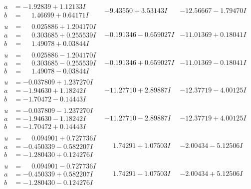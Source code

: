 \documentclass[1p]{elsarticle_modified}
\theoremstyle{definition}
\begin{document}
$$\begin{array}{c|c|c}
\begin{aligned}
a &= -1.92839 + 1.12133 I \\
b &= \phantom{-}1.46699 + 0.64171 I\end{aligned}
 & -9.43550 + 3.53143 I & -12.56667 - 1.79470 I \\ \hline\begin{aligned}
u &= \phantom{-}0.025886 + 1.204170 I \\
a &= \phantom{-}0.303685 + 0.255539 I \\
b &= \phantom{-}1.49078 + 0.03844 I\end{aligned}
 & -0.191346 - 0.659027 I & -11.01369 + 0.18041 I \\ \hline\begin{aligned}
u &= \phantom{-}0.025886 - 1.204170 I \\
a &= \phantom{-}0.303685 - 0.255539 I \\
b &= \phantom{-}1.49078 - 0.03844 I\end{aligned}
 & -0.191346 + 0.659027 I & -11.01369 - 0.18041 I \\ \hline\begin{aligned}
u &= -0.037809 + 1.237270 I \\
a &= -1.94630 + 1.18242 I \\
b &= -1.70472 - 0.14443 I\end{aligned}
 & -11.27710 + 2.89887 I & -12.37719 - 4.00125 I \\ \hline\begin{aligned}
u &= -0.037809 - 1.237270 I \\
a &= -1.94630 - 1.18242 I \\
b &= -1.70472 + 0.14443 I\end{aligned}
 & -11.27710 - 2.89887 I & -12.37719 + 4.00125 I \\ \hline\begin{aligned}
u &= \phantom{-}0.094901 + 0.727736 I \\
a &= -0.450339 - 0.582207 I \\
b &= -1.280430 + 0.124276 I\end{aligned}
 & \phantom{-}1.74291 + 1.07503 I & -2.00434 - 5.12506 I \\ \hline\begin{aligned}
u &= \phantom{-}0.094901 - 0.727736 I \\
a &= -0.450339 + 0.582207 I \\
b &= -1.280430 - 0.124276 I\end{aligned}
 & \phantom{-}1.74291 - 1.07503 I & -2.00434 + 5.12506 I \\ \hline\begin{aligned}

\end{aligned}
\end{array}$$
\end{document}
